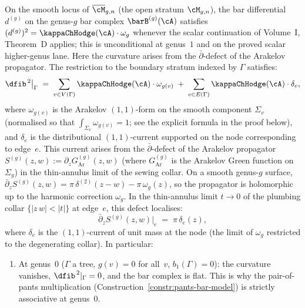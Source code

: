 \begin{proposition}%
\label{prop:nodal-curvature-source}%
%
%
%
On the smooth locus of $\overline{\cM}_{g,n}$
(the open stratum $\cM_{g,n}$), the bar differential
$d^{(g)}$ on the genus-$g$ bar complex
$\barB^{(g)}(\cA)$ satisfies
$(d^{(g)})^2 = \kappaChHodge(\cA)\cdot\omega_g$ whenever the scalar
continuation of Volume~I, Theorem~D applies; this is
unconditional at genus~$1$ and on the proved scalar
higher-genus lane. Here the curvature arises from the
$\bar\partial$-defect of the Arakelov propagator. The restriction to
the boundary stratum indexed by $\Gamma$ satisfies:
\begin{equation}\label{eq:nodal-curvature-decomposition}
 \dfib^{\,2}\big|_\Gamma
 \;=\;
 \sum_{v\in V(\Gamma)}
 \kappaChHodge(\cA)\cdot\omega_{g(v)}
 \;+\;
 \sum_{e\in E(\Gamma)}
 \kappaChHodge(\cA)\cdot\delta_e,
\end{equation}
where $\omega_{g(v)}$ is the Arakelov $(1,1)$-form on the smooth
component $\Sigma_v$ (normalised so that
$\int_{\Sigma_v}\omega_{g(v)}=1$; see the explicit
formula in the proof below), and $\delta_e$ is the
distributional $(1,1)$-current supported on the node
corresponding to edge~$e$. This current arises from
the $\bar\partial$-defect of the Arakelov propagator
$S^{(g)}(z,w):=\partial_z G_{\mathrm{Ar}}^{(g)}(z,w)$
(where $G_{\mathrm{Ar}}^{(g)}$ is the Arakelov Green
function on $\Sigma_g$) in the thin-annulus limit of
the sewing collar. On a smooth genus-$g$ surface,
$\bar\partial_z S^{(g)}(z,w) = \pi\,\delta^{(2)}(z-w)
- \pi\,\omega_g(z)$, so the propagator is holomorphic
up to the harmonic correction $\omega_g$. In the
thin-annulus limit $t\to 0$ of the plumbing collar
$\{|z\,w|<|t|\}$ at edge~$e$, this defect localises:
\begin{equation}\label{eq:node-dbar-defect}
 \bar\partial_z S^{(g)}(z,w)\big|_{e}
 \;=\; \pi\,\delta_e(z),
\end{equation}
where $\delta_e$ is the $(1,1)$-current of unit mass
at the node (the limit of $\omega_g$ restricted to the
degenerating collar).
In particular:
\begin{enumerate}[label=\textup{(\alph*)}]
\item At genus~$0$
 \textup{(}$\Gamma$ a tree, $g(v)=0$ for all~$v$,
 $b_1(\Gamma)=0$\textup{)}: the curvature vanishes,
 $\dfib^{\,2}|_\Gamma = 0$, and the bar complex is flat.
 This is why the pair-of-pants multiplication
 \textup{(}Construction~\textup{\ref{constr:pants-bar-model}}\textup{)}
 is strictly associative at genus~$0$.


\end{enumerate}
\end{proposition}
